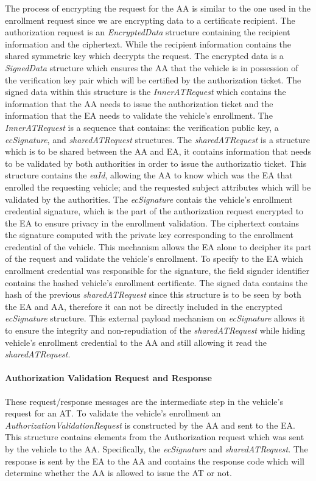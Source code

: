 The process of encrypting the request for the AA is similar to the one used in the enrollment request since we are encrypting data to a certificate recipient. The authorization request is an \textit{EncryptedData} structure containing the recipient information and the ciphertext. While the recipient information contains the shared symmetric key which decrypts the request. The encrypted data is a \textit{SignedData} structure which ensures the AA that the vehicle is in possession of the verification key pair which will be certified by the authorization ticket. The signed data within this structure is the \textit{InnerATRequest} which contains the information that the AA needs to issue the authorization ticket and the information that the EA needs to validate the vehicle's enrollment. The \textit{InnerATRequest} is a sequence that contains: the verification public key, a \textit{ecSignature}, and \textit{sharedATRequest} structures. The \textit{sharedATRequest} is a structure which is to be shared between the AA and EA, it contains information that needs to be validated by both authorities in order to issue the authorizatio ticket. This structure contains the \textit{eaId}, allowing the AA to know which was the EA that enrolled the requesting vehicle; and the requested subject attributes which will be validated by the authorities. The \textit{ecSignature} contais the vehicle's enrollment credential signature, which is the part of the authorization request encrypted to the EA to ensure privacy in the enrollment validation. The ciphertext contains the signature computed with the private key corresponding to the enrollment credential of the vehicle. This mechanism allows the EA alone to decipher its part of the request and validate the vehicle's enrollment. To specify to the EA which enrollment credential was responsible for the signature, the field signder identifier contains the hashed vehicle's enrollment certificate. The signed data contains the hash of the previous \textit{sharedATRequest} since this structure is to be seen by both the EA and AA, therefore it can not be directly included in the encrypted \textit{ecSignature} structure. This external payload mechanism on \textit{ecSignature} allows it to ensure the integrity and non-repudiation of the \textit{sharedATRequest} while hiding vehicle's enrollment credential to the AA and still allowing it read the \textit{sharedATRequest}. 

\paragraph{Authorization Validation Request and Response}
These request/response messages are the intermediate step in the vehicle's request for an AT. To validate the vehicle's enrollment an \textit{AuthorizationValidationRequest} is constructed by the AA and sent to the EA. This structure contains elements from the Authorization request which was sent by the vehicle to the AA. Specifically, the \textit{ecSignature} and \textit{sharedATRequest}. The response is sent by the EA to the AA and contains the response code which will determine whether the AA is allowed to issue the AT or not. 

